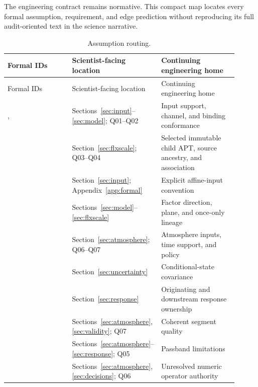 \small
The engineering contract remains normative. This compact map locates every
formal assumption, requirement, and edge prediction without reproducing its
full audit-oriented text in the science narrative.

\begin{longtable}{L{0.30\linewidth}L{0.26\linewidth}L{0.35\linewidth}}
\caption{Assumption routing.}\\
\toprule Formal IDs & Scientist-facing location & Continuing engineering home \\
\midrule\endfirsthead\toprule Formal IDs & Scientist-facing location & Continuing engineering home \\
\midrule\endhead
{},  & Sections~\ref{sec:input}--\ref{sec:model}; Q01--Q02 & Input support, channel, and binding conformance \\
 & Section~\ref{sec:flxscale}; Q03--Q04 & Selected immutable child APT, source ancestry, and association \\
 & Section~\ref{sec:input}; Appendix~\ref{app:formal} & Explicit affine-input convention \\
 & Sections~\ref{sec:model}--\ref{sec:flxscale} & Factor direction, plane, and once-only lineage \\
 & Section~\ref{sec:atmosphere}; Q06--Q07 & Atmosphere inputs, time support, and policy \\
 & Section~\ref{sec:uncertainty} & Conditional-state covariance \\
 & Section~\ref{sec:response} & Originating and downstream response ownership \\
 & Sections~\ref{sec:atmosphere}, \ref{sec:validity}; Q07 & Coherent segment quality \\
 & Sections~\ref{sec:atmosphere}--\ref{sec:response}; Q05 & Passband limitations \\
 & Sections~\ref{sec:atmosphere}, \ref{sec:decisions}; Q06 & Unresolved numeric operator authority \\
\bottomrule
\end{longtable}

